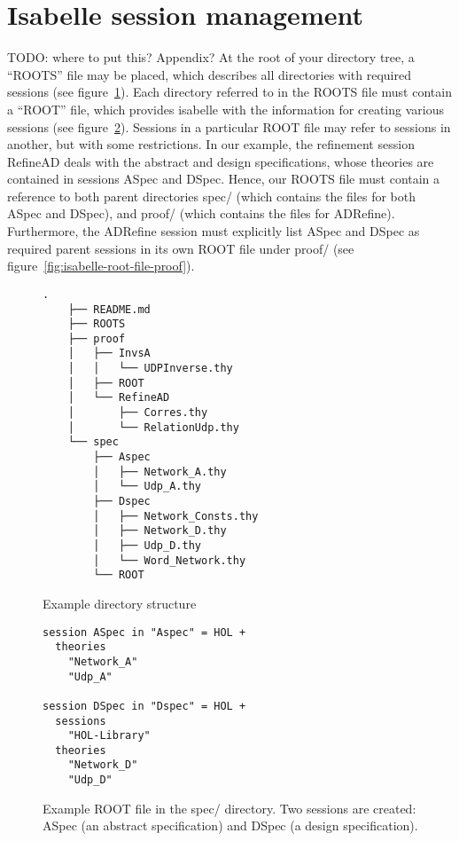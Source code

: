 \documentclass[twoside]{memoir}
\begin{document}
\section{Isabelle session management}
TODO: where to put this? Appendix?
At the root of your directory tree, a ``ROOTS'' file may be placed, which describes all directories with required sessions (see figure~\ref{fig:isabelle-roots-file}).
Each directory referred to in the ROOTS file must contain a ``ROOT'' file, which provides isabelle with the information for creating various sessions
(see figure~\ref{fig:isabelle-root-file-spec}).
Sessions in a particular ROOT file may refer to sessions in another, but with some restrictions.
In our example, the refinement session RefineAD deals with the abstract and design specifications, whose theories are contained in sessions
ASpec and DSpec.
Hence, our ROOTS file must contain a reference to both parent directories spec/ (which contains the files for both ASpec and DSpec), and proof/
(which contains the files for ADRefine).
Furthermore, the ADRefine session must explicitly list ASpec and DSpec as required parent sessions in its own ROOT file under proof/ (see figure~\ref{fig:isabelle-root-file-proof}).

\begin{figure}[htpb]
    \centering
    \begin{lstlisting}[style=tree, language=file]
    .
    ├── README.md
    ├── ROOTS
    ├── proof
    │   ├── InvsA
    │   │   └── UDPInverse.thy
    │   ├── ROOT
    │   └── RefineAD
    │       ├── Corres.thy
    │       └── RelationUdp.thy
    └── spec
        ├── Aspec
        │   ├── Network_A.thy
        │   └── Udp_A.thy
        ├── Dspec
        │   ├── Network_Consts.thy
        │   ├── Network_D.thy
        │   ├── Udp_D.thy
        │   └── Word_Network.thy
        └── ROOT
    \end{lstlisting}
    
    \caption{Example directory structure}
    \label{fig:isabelle-roots-file}
\end{figure}

\begin{figure}[htpb]
    \centering
    \begin{lstlisting}[language=isabelle]
session ASpec in "Aspec" = HOL +
  theories
    "Network_A"
    "Udp_A"

session DSpec in "Dspec" = HOL +
  sessions
    "HOL-Library"
  theories
    "Network_D"
    "Udp_D"
    \end{lstlisting}
    
    \caption{Example ROOT file in the spec/ directory. Two sessions are created: ASpec (an abstract specification) and DSpec (a design specification).}
    \label{fig:isabelle-root-file-spec}
\end{figure}
\end{document}
